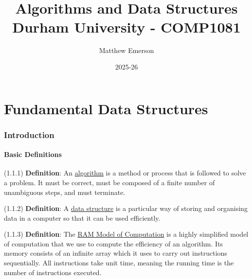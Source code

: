 \documentclass{article}
\title{Algorithms and Data Structures \\ \small Durham University - COMP1081}
\author{Matthew Emerson}
\date{2025-26} %
\newcommand{\separate}[1] {\vspace{#1 pt}\noindent}
\newcommand{\definition}[2]{(#1) \textbf{Definition}: #2}
\begin{document}



\pagestyle{fancy}
\fancyfoot{}




\maketitle
\thispagestyle{empty}




\newpage
\thispagestyle{empty}

\setcounter{tocdepth}{2}
\tableofcontents




\setcounter{page}{0}
\newpage

\part{Fundamental Data Structures}\label{part:1.fds}

\section{Introduction}

\subsection{Basic Definitions}

\definition{1.1.1}{An \underline{algorithm} is a method or process that is followed to solve a problem. It must be correct, must be composed of a finite number of unambiguous steps, and must terminate.}

\separate{5}\definition{1.1.2}{A \underline{data structure} is a particular way of storing and organising data in a computer so that it can be used efficiently.}

\separate{5}\definition{1.1.3}{The \underline{RAM Model of Computation} is a highly simplified model of computation that we use to compute the efficiency of an algorithm. Its memory consists of an infinite array which it uses to carry out instructions sequentially. All instructions take unit time, meaning the running time is the number of instructions executed.}
\end{document}
